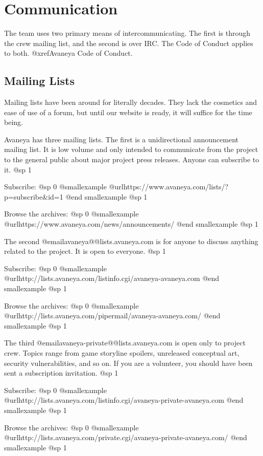 \section{Communication}
The team uses two primary means of intercommunicating. The first is through the crew mailing list, and the second is over IRC. The Code of Conduct applies to both. @xref{Avaneya Code of Conduct}.

\subsection{Mailing Lists}
Mailing lists have been around for literally decades. They lack the cosmetics and ease of use of a forum, but until our website is ready, it will suffice for the time being.

Avaneya has three mailing lists. The first is a unidirectional announcement mailing list. It is low volume and only intended to communicate from the project to the general public about major project press releases. Anyone can subscribe to it.
@sp 1

Subscribe:
@sp 0
@smallexample
@url{https://www.avaneya.com/lists/?p=subscribe&id=1} 
@end smallexample
@sp 1

Browse the archives:
@sp 0
@smallexample
@url{https://www.avaneya.com/news/announcements/}
@end smallexample
@sp 1

The second @email{avaneya@@lists.avaneya.com} is for anyone to discuss anything related to the project. It is open to everyone.
@sp 1

Subscribe:
@sp 0
@smallexample
@url{http://lists.avaneya.com/listinfo.cgi/avaneya-avaneya.com} 
@end smallexample
@sp 1

Browse the archives:
@sp 0
@smallexample
@url{http://lists.avaneya.com/pipermail/avaneya-avaneya.com/}
@end smallexample
@sp 1

The third @email{avaneya-private@@lists.avaneya.com} is open only to project crew. Topics range from game storyline spoilers, unreleased conceptual art, security vulnerabilities, and so on. If you are a volunteer, you should have been sent a subscription invitation.
@sp 1

Subscribe:
@sp 0
@smallexample
@url{http://lists.avaneya.com/listinfo.cgi/avaneya-private-avaneya.com} 
@end smallexample
@sp 1

Browse the archives:
@sp 0
@smallexample
@url{http://lists.avaneya.com/private.cgi/avaneya-private-avaneya.com/}
@end smallexample
@sp 1

